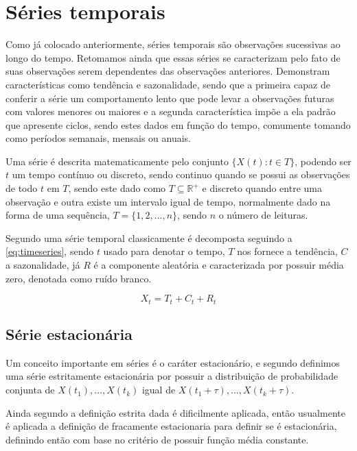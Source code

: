 \documentclass[
    12pt,
    oneside,
    a4paper,
    english,
    brazil
]{abntex2}
\begin{document}
\section{Séries temporais}

Como já colocado anteriormente, séries temporais são observações sucessivas ao 
longo do tempo. Retomamos ainda que essas séries se caracterizam pelo fato de 
suas observações serem dependentes das observações anteriores. Demonstram 
características como tendência e sazonalidade, sendo que a primeira capaz de 
conferir a série um comportamento lento que pode levar a observações futuras com 
valores menores ou maiores e a segunda característica impõe a ela padrão que 
apresente ciclos, sendo estes dados em função do tempo, comumente tomando como 
períodos semanais, mensais ou anuais.

Uma série é descrita matematicamente pelo conjunto $\{X(t): t \in T\}$, podendo 
ser $t$ um tempo contínuo ou discreto, sendo continuo quando se possui as 
observações de todo $t$ em $T$, sendo este dado como $T \subseteq 
\mathbb{R}^{+}$ e discreto quando entre uma observação e outra existe um 
intervalo igual de tempo, normalmente dado na forma de uma sequência, $T = \{1, 
2, \ldots, n\}$, sendo $n$ o número de leituras.

Segundo  uma série temporal classicamente é decomposta 
seguindo a \autoref{eq:timeseries}, sendo $t$ usado para denotar o tempo, $T$ 
nos fornece a tendência, $C$ a sazonalidade, já $R$ é a componente aleatória e 
caracterizada por possuir média zero, denotada como ruído branco.

\begin{equation}
    \label{eq:timeseries}
    X_t = T_t + C_t + R_t
\end{equation}

\subsection{Série estacionária}

Um conceito importante em séries é o caráter estacionário, e segundo 
 definimos uma série estritamente estacionária por possuir a 
distribuição de probabilidade conjunta de $X(t_1), \ldots, X(t_k)$ igual de 
$X(t_1 + \tau), \ldots, X(t_k + \tau)$.

Ainda segundo  a definição estrita dada é dificilmente 
aplicada, então usualmente é aplicada a definição de fracamente estacionaria 
para definir se é estacionária, definindo então com base no critério de possuir 
função média constante.
\end{document}
